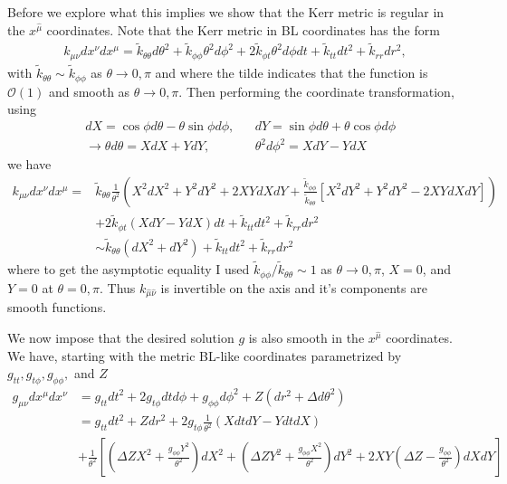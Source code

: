 \documentclass[aps,prd,amsmath,showpacs,amssymb,superscriptaddress,nofootinbib,longbibliography,eqsecnum,preprintnumbers]{revtex4-1}
\begin{document}
Before we explore what this implies we show that the Kerr metric is regular in the $x^{\hat \mu}$ coordinates. Note that the Kerr metric in BL coordinates has the form
\begin{align}
k_{\mu\nu}dx^\nu dx^\mu = \tilde k_{\theta \theta}d\theta^2+\tilde k_{\phi\phi} \theta ^2 d\phi^2+2\tilde k_{\phi t}\theta^2 d\phi dt +\tilde k_{tt}dt^2+\tilde k_{rr}dr^2,
\end{align}
with $\tilde k_{\theta \theta} \sim \tilde k_{\phi\phi}$ as $\theta \to 0, \pi$ and
where the tilde indicates that the function is $\mathcal{O}(1)$ and smooth as $\theta \to 0, \pi$. Then performing the coordinate transformation, using
\begin{align}
&dX = \cos \phi d\theta -\theta\sin\phi d\phi, & &dY=\sin \phi d\theta+\theta\cos \phi d\phi \nonumber \\
&\to \theta d\theta =XdX+YdY,& &\theta^2 d\phi^2 =XdY-YdX
\end{align}
we have
\begin{align}
k_{\mu\nu}dx^\nu dx^\mu=& \tilde k_{\theta \theta}\frac{1}{\theta^2}\left(X^2dX^2+Y^2dY^2+2XYdXdY+\frac{\tilde k_{\phi\phi}}{\tilde k_{\theta\theta}}\left[X^2dY^2+Y^2dY^2-2XYdXdY\right]\right) \nonumber \\
&+2\tilde k_{\phi t}(XdY-YdX)dt+\tilde k_{tt}dt^2+\tilde k_{rr}dr^2 \nonumber \\
&\sim \tilde k_{\theta\theta}(dX^2+dY^2)+\tilde k_{tt}dt^2 +\tilde k_{rr}dr^2
\end{align} 
where to get the asymptotic equality I used $\tilde k_{\phi\phi}/\tilde k_{\theta \theta}\sim 1$ as $\theta \to 0, \pi$, $X =0$, and $Y = 0$ at $\theta =0,\pi$. Thus $k_{\hat \mu \hat \nu}$ is invertible on the axis and it's components are smooth functions.

We now impose that the desired solution $g$ is also smooth in the $x^{\hat \mu}$ coordinates. We have, starting with the metric BL-like coordinates parametrized by $g_{tt}, g_{t\phi}, g_{\phi\phi},$ and $Z$
\begin{align}
g_{\mu \nu}dx^\mu dx^{\nu} &=g_{tt}dt^2+2g_{t\phi}dtd\phi +g_{\phi\phi}d\phi^2+Z(dr^2+\Delta d\theta^2) \nonumber \\
&=g_{tt}dt^2+Zdr^2+2g_{t\phi}\frac{1}{\theta^2}(XdtdY-YdtdX)
\nonumber \\
&+\frac{1}{\theta^2}\left[\left(\Delta Z X^2+\frac{g_{\phi\phi}Y^2}{\theta^2}\right)dX^2
+\left(\Delta Z Y^2+\frac{g_{\phi\phi}X^2}{\theta^2}\right)dY^2+2XY\left(\Delta Z -\frac{g_{\phi\phi}}{\theta^2}\right)dXdY\right]
\end{align}
\end{document}
